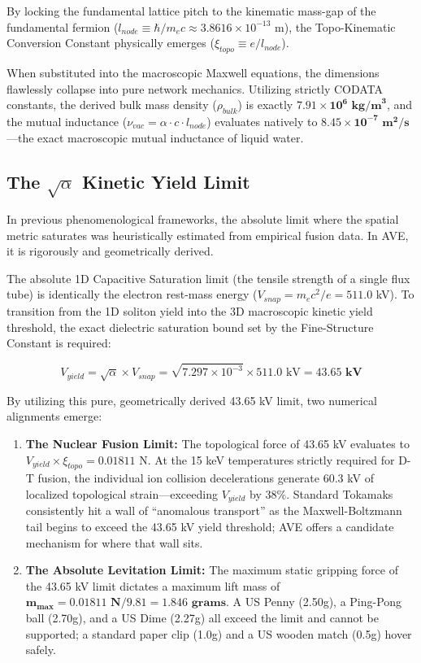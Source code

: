 By locking the fundamental lattice pitch to the kinematic mass-gap of the fundamental fermion ($l_{node} \equiv \hbar/m_e c \approx 3.8616 \times 10^{-13}$ m), the Topo-Kinematic Conversion Constant physically emerges ($\xi_{topo} \equiv e/l_{node}$).

When substituted into the macroscopic Maxwell equations, the dimensions flawlessly collapse into pure network mechanics. Utilizing strictly CODATA constants, the derived bulk mass density ($\rho_{bulk}$) is exactly $\mathbf{7.91 \times 10^6 \text{ kg/m}^3}$, and the mutual inductance ($\nu_{vac} = \alpha \cdot c \cdot l_{node}$) evaluates natively to $\mathbf{8.45 \times 10^{-7} \text{ m}^2\text{/s}}$---the exact macroscopic mutual inductance of liquid water.

\subsection{The $\sqrt{\alpha}$ Kinetic Yield Limit}
In previous phenomenological frameworks, the absolute limit where the spatial metric saturates was heuristically estimated from empirical fusion data. In AVE, it is rigorously and geometrically derived.

The absolute 1D Capacitive Saturation limit (the tensile strength of a single flux tube) is identically the electron rest-mass energy ($V_{snap} = m_e c^2 / e = 511.0$ kV). To transition from the 1D soliton yield into the 3D macroscopic kinetic yield threshold, the exact dielectric saturation bound set by the Fine-Structure Constant is required:
\begin{tcolorbox}[colback=white, colframe=black]
\begin{equation}
    V_{yield} = \sqrt{\alpha} \times V_{snap} = \sqrt{7.297 \times 10^{-3}} \times 511.0 \text{ kV} = \mathbf{43.65 \text{ kV}}
\end{equation}
\end{tcolorbox}

By utilizing this pure, geometrically derived 43.65 kV limit, two numerical alignments emerge:
\begin{enumerate}
    \item \textbf{The Nuclear Fusion Limit:} The topological force of 43.65 kV evaluates to $V_{yield} \times \xi_{topo} = 0.01811$ N. At the 15 keV temperatures strictly required for D-T fusion, the individual ion collision decelerations generate $60.3$ kV of localized topological strain---exceeding $V_{yield}$ by 38\%. Standard Tokamaks consistently hit a wall of ``anomalous transport'' as the Maxwell-Boltzmann tail begins to exceed the 43.65 kV yield threshold; AVE offers a candidate mechanism for where that wall sits.
    \item \textbf{The Absolute Levitation Limit:} The maximum static gripping force of the 43.65 kV limit dictates a maximum lift mass of $\mathbf{m_{max} = 0.01811 \text{ N} / 9.81 = 1.846 \text{ grams}}$. A US Penny (2.50g), a Ping-Pong ball (2.70g), and a US Dime (2.27g) all exceed the limit and cannot be supported; a standard paper clip (1.0g) and a US wooden match (0.5g) hover safely.
\end{enumerate}

